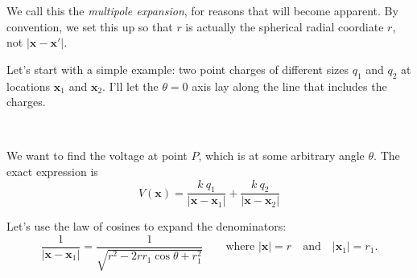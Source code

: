 \documentclass{article}
\begin{document}
We call this the \emph{multipole expansion}, for reasons that will become apparent. By convention, we set this up so that $r$ is actually the spherical radial coordiate $r$, not $\left| \bm{x} - \bm{x'} \right|$.

Let's start with a simple example: two point charges of different sizes $q_1$ and $q_2$ at locations $\bm{x}_1$ and $\bm{x}_2$. I'll let the $\theta = 0$ axis lay along the line that includes the charges.

\vspace{1em}

\begin{minipage}{0.5\textwidth}
\begin{figure}[H]
\centering
{}
\end{figure}
\end{minipage}
~
\begin{minipage}{0.4\textwidth}
    We want to find the voltage at point $P$, which is at some arbitrary angle $\theta$. The exact expression is
\begin{equation*}
    V(\bm{x}) = \frac{k\ q_1}{\left| \bm{x} - \bm{x}_1 \right|} + \frac{k\ q_2}{\left| \bm{x} - \bm{x}_2 \right|}
\end{equation*}
\end{minipage}

\vspace{1em}

Let's use the law of cosines to expand the denominators:
\begin{equation*}
    \frac{1}{\left| \bm{x} - \bm{x}_1 \right|} = \frac{1}{\sqrt{r^2 - 2 r r_1 \cos{\theta} + r_1^2}} \qquad \text{where } \left| \bm{x} \right| = r \quad\text{and}\quad \left| \bm{x}_1 \right| = r_1.
\end{equation*}
\end{document}
